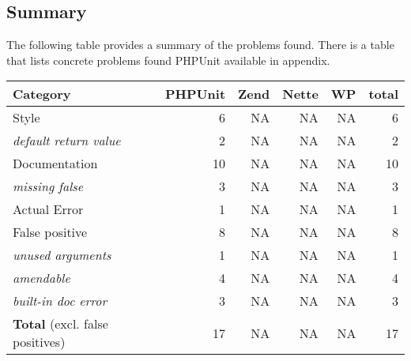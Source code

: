 \subsection{Summary}

The following table provides a summary of the problems found. 
There is a table that lists concrete problems found PHPUnit 
available in appendix.

\newcommand{\subcat}[1]{\hspace{0.5cm}\small{\textit{#1}}} 
\newcommand{\reldefret}{\subcat{default return value}}

\newcommand{\sumh}[1]{\textbf{#1}}

\begin{center}
    \begin{tabular}{| p{5cm} | r | r | r | r | r |}
    \hline
    \sumh{Category}         &   \sumh{PHPUnit}      &   \sumh{Zend}       &   \sumh{Nette}    &   \sumh{WP}    &   \sumh{total}   \\ \hline
    Style                   &   6                   &       NA                      &   NA              &   NA                  &   6       \\ \hline
    \reldefret              &   2                   &       NA                      &   NA              &   NA                  &   2       \\ \hline        
    Documentation           &   10                  &       NA                      &   NA              &   NA                  &   10      \\ \hline    
    \subcat{missing false}  &   3                   &       NA                      &   NA              &   NA                  &   3       \\ \hline
    Actual Error            &   1                   &       NA                      &   NA              &   NA                  &   1      \\ \hline    
    False positive          &   8                   &       NA                      &   NA              &   NA                  &   8      \\ \hline    
   \subcat{unused arguments}&   1                   &       NA                      &   NA              &   NA                  &   1      \\ \hline        
    \subcat{amendable}      &   4                   &       NA                      &   NA              &   NA                  &   4      \\ \hline            
 \subcat{built-in doc error}&   3                   &       NA                      &   NA              &   NA                  &   3      \\ \hline
    \textbf{Total} 
    (excl. false positives) &17                   &       NA                      &   NA              &   NA                  &   17      \\ \hline                
    \end{tabular}
\end{center}



